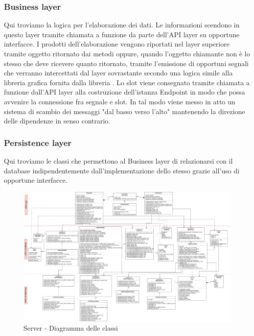 	\subsubsection{Business layer}
		Qui troviamo la logica per l'elaborazione dei dati. Le informazioni scendono in questo layer tramite chiamata a funzione da parte dell'API layer su opportune interfacce. I prodotti dell'elaborazione vengono riportati nel layer superiore tramite oggetto ritornato dai metodi oppure, quando l'oggetto chiamante non è lo stesso che deve ricevere quanto ritornato, tramite l'emissione di opportuni segnali che verranno intercettati dal layer sovrastante secondo una logica  simile alla libreria grafica  fornita dalla libreria . Lo slot viene consegnato tramite chiamata a funzione dall'API layer alla costruzione dell'istanza Endpoint in modo che possa avvenire la connessione fra segnale e slot. In tal modo viene messo in atto un sistema di scambio dei messaggi "dal basso verso l'alto" mantenendo la direzione delle dipendenze in senso contrario.

	\subsubsection{Persistence layer}
		Qui troviamo le classi che permettono al Business layer di relazionarsi con il database indipendentemente dall'implementazione dello stesso grazie all'uso di opportune interfacce.

		\begin{landscape}
			\begin{figure}[h!]
				\includegraphics[width=26cm]{img/server_classi.png}
				\caption{Server - Diagramma delle classi}
			\end{figure}
		\end{landscape}
	
